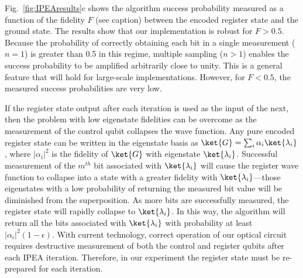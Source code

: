 \documentclass[11pt,oneside,final]{huthesis}%
\begin{document}
Fig.~\ref{fig:IPEAresults}c shows the algorithm success probability measured as a function of the 
fidelity $F$ (see caption) between the encoded register state and the ground state. The results 
show that our implementation is robust for $F > 0.5$. Because the probability of correctly 
obtaining each bit in a single measurement ($n=1$) is greater than 0.5 in this regime, multiple 
sampling ($n>1$) enables the success probability to be amplified arbitrarily close to unity. This 
is a general feature that will hold for large-scale implementations. However, for $F<0.5$, 
the measured success probabilities are very low. 

If the register state output after each iteration is used as the input of the next, then the problem 
with low eigenstate fidelities can be overcome as the measurement of the control qubit 
collapses the wave function.  Any pure encoded register state can be written in the eigenstate 
basis as $\ket{G}=\sum_i\alpha_i\ket{\lambda_i}$, where $|\alpha_i|^2$ is the fidelity of $\ket{G}
$ with eigenstate $\ket{\lambda_i}$. Successful measurement of the $m^{{th}}$ bit 
associated with $\ket{\lambda_i}$ will cause the register wave function to collapse into a state 
with a greater fidelity with $\ket{\lambda_i}$---those eigenstates with a low probability of 
returning the measured bit value will be diminished from the superposition. As more bits are 
successfully measured, the register state will rapidly collapse to $\ket{\lambda_i}$.
In this way, the algorithm will return all the bits associated with $\ket{\lambda_i}$ with probability 
at least $|\alpha_i|^2(1-\epsilon)$.
With current technology, correct operation of our optical circuit requires destructive 
measurement of both the control and register qubits after each IPEA iteration. Therefore, in our 
experiment the register state must be re-prepared for each iteration. 
\end{document}
